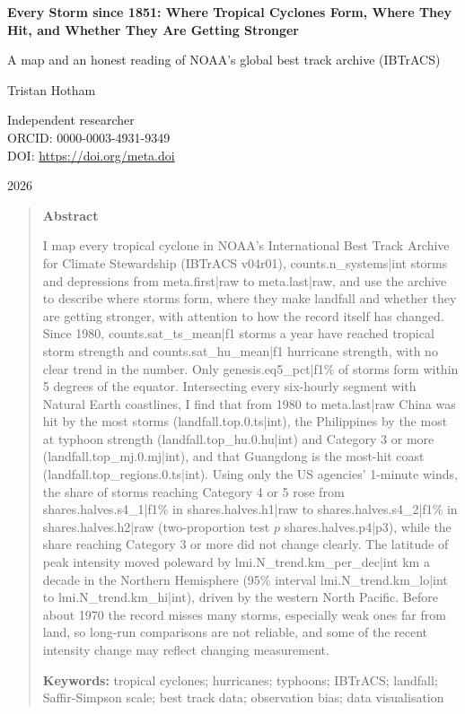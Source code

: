 \documentclass[11pt,a4paper]{article}
\begin{document}
\begin{center}
{\Large\bfseries Every Storm since 1851: Where Tropical Cyclones Form, Where They Hit, and Whether They Are Getting Stronger\par}
\vspace{0.4em}
{\large A map and an honest reading of NOAA's global best track archive (IBTrACS)\par}
\vspace{1.2em}
{\large Tristan Hotham\par}
\vspace{0.3em}
{\small Independent researcher\\
ORCID: 0000-0003-4931-9349\\
DOI: \href{https://doi.org/{{meta.doi}}}{https://doi.org/{{meta.doi}}}\par}
\vspace{0.8em}
2026
\end{center}

\begin{quote}
\small
\begin{center}\textbf{Abstract}\end{center}
I map every tropical cyclone in NOAA's International Best Track Archive for Climate Stewardship (IBTrACS v04r01), {{counts.n_systems|int}} storms and depressions from {{meta.first|raw}} to {{meta.last|raw}}, and use the archive to describe where storms form, where they make landfall and whether they are getting stronger, with attention to how the record itself has changed. Since 1980, {{counts.sat_ts_mean|f1}} storms a year have reached tropical storm strength and {{counts.sat_hu_mean|f1}} hurricane strength, with no clear trend in the number. Only {{genesis.eq5_pct|f1}}\% of storms form within 5 degrees of the equator. Intersecting every six-hourly segment with Natural Earth coastlines, I find that from 1980 to {{meta.last|raw}} China was hit by the most storms ({{landfall.top.0.ts|int}}), the Philippines by the most at typhoon strength ({{landfall.top_hu.0.hu|int}}) and Category 3 or more ({{landfall.top_mj.0.mj|int}}), and that Guangdong is the most-hit coast ({{landfall.top_regions.0.ts|int}}). Using only the US agencies' 1-minute winds, the share of storms reaching Category 4 or 5 rose from {{shares.halves.s4_1|f1}}\% in {{shares.halves.h1|raw}} to {{shares.halves.s4_2|f1}}\% in {{shares.halves.h2|raw}} (two-proportion test $p$ {{shares.halves.p4|p3}}), while the share reaching Category 3 or more did not change clearly. The latitude of peak intensity moved poleward by {{lmi.N_trend.km_per_dec|int}} km a decade in the Northern Hemisphere (95\% interval {{lmi.N_trend.km_lo|int}} to {{lmi.N_trend.km_hi|int}}), driven by the western North Pacific. Before about 1970 the record misses many storms, especially weak ones far from land, so long-run comparisons are not reliable, and some of the recent intensity change may reflect changing measurement.

\textbf{Keywords:} tropical cyclones; hurricanes; typhoons; IBTrACS; landfall; Saffir-Simpson scale; best track data; observation bias; data visualisation
\end{quote}
\end{document}
